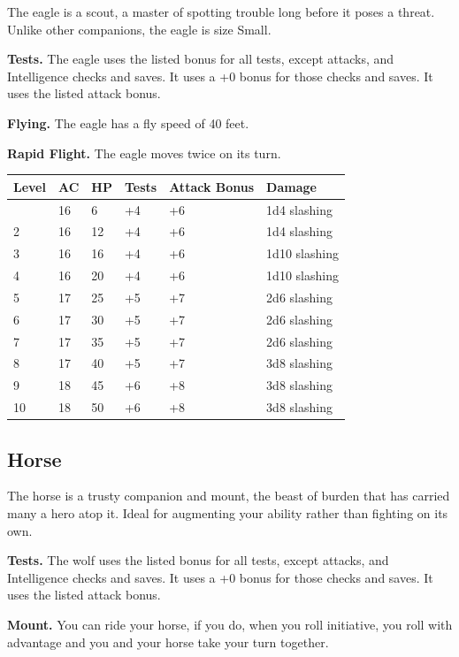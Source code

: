\documentclass[12pt,letterpaper,twocolumn,openany,nodeprecatedcode,bg=none]{dndbook}
\begin{document}
The eagle is a scout, a master of spotting trouble long before it poses
a threat. Unlike other companions, the eagle is size Small.

\textbf{Tests.} The eagle uses the listed bonus for all tests, except
attacks, and Intelligence checks and saves. It uses a +0 bonus for those
checks and saves. It uses the listed attack bonus.

\textbf{Flying.} The eagle has a fly speed of 40 feet.

\textbf{Rapid Flight.} The eagle moves twice on its turn.

\begin{longtable}[]{@{}llllll@{}}
\toprule\noalign{}
Level & AC & HP & Tests & Attack Bonus & Damage \\
\midrule\noalign{}
\endhead
\bottomrule\noalign{}
\endlastfoot
1 & 16 & 6 & +4 & +6 & 1d4 slashing \\
2 & 16 & 12 & +4 & +6 & 1d4 slashing \\
3 & 16 & 16 & +4 & +6 & 1d10 slashing \\
4 & 16 & 20 & +4 & +6 & 1d10 slashing \\
5 & 17 & 25 & +5 & +7 & 2d6 slashing \\
6 & 17 & 30 & +5 & +7 & 2d6 slashing \\
7 & 17 & 35 & +5 & +7 & 2d6 slashing \\
8 & 17 & 40 & +5 & +7 & 3d8 slashing \\
9 & 18 & 45 & +6 & +8 & 3d8 slashing \\
10 & 18 & 50 & +6 & +8 & 3d8 slashing \\
\end{longtable}

\subsection{Horse}\label{horse}

The horse is a trusty companion and mount, the beast of burden that has
carried many a hero atop it. Ideal for augmenting your ability rather
than fighting on its own.

\textbf{Tests.} The wolf uses the listed bonus for all tests, except
attacks, and Intelligence checks and saves. It uses a +0 bonus for those
checks and saves. It uses the listed attack bonus.

\textbf{Mount.} You can ride your horse, if you do, when you roll
initiative, you roll with advantage and you and your horse take your
turn together.
\end{document}
